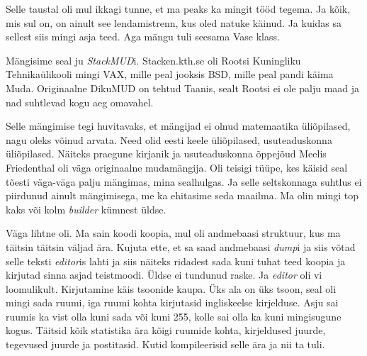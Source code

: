 Selle taustal oli mul ikkagi tunne, et ma peaks ka mingit tööd tegema. Ja kõik, 
mis sul on, on ainult see lendamistrenn, kus oled natuke käinud. Ja kuidas sa 
sellest siis mingi asja teed. Aga mängu tuli seesama Vase klass.

Mängisime seal ju \emph{StackMUD}i. Stacken.kth.se oli Rootsi 
Kuningliku Tehnikaülikooli mingi 
VAX, mille peal 
jooksis BSD, mille peal pandi käima Muda. 
Originaalne DikuMUD on tehtud Taanis, sealt Rootsi ei ole palju maad ja nad 
suhtlevad kogu aeg omavahel.

Selle mängimise tegi huvitavaks, et mängijad ei olnud  matemaatika üliõpilased, 
nagu oleks võinud arvata. Need olid eesti keele üliõpilased, usuteaduskonna 
üliõpilased. Näiteks praegune kirjanik ja usuteaduskonna õppejõud Meelis 
Friedenthal oli väga originaalne mudamängija. 
Oli teisigi tüüpe, kes  käisid seal tõesti väga-väga palju mängimas, mina 
sealhulgas. Ja selle seltskonnaga suhtlus ei  piirdunud ainult 
mängimisega, me ka ehitasime seda maailma. Ma olin mingi top kaks või kolm 
\emph{builder} kümnest üldse.


Väga lihtne oli. Ma sain koodi koopia, mul oli andmebaasi struktuur, kus ma 
täitsin täitsin väljad ära. Kujuta ette, et sa saad andmebaasi \emph{dump}i ja 
siis võtad selle teksti \emph{editor}is lahti ja siis  näiteks ridadest sada 
kuni tuhat teed koopia ja  kirjutad sinna asjad teistmoodi. Üldse ei tundunud 
raske. Ja \emph{editor} oli vi 
loomulikult. Kirjutamine käis tsoonide kaupa. Üks ala on üks tsoon, seal oli 
mingi sada ruumi, iga ruumi kohta kirjutasid ingliskeelse kirjelduse. Asju sai 
ruumis ka vist olla kuni sada või kuni 255, kolle sai olla ka kuni mingisugune 
kogus. Täitsid kõik statistika ära kõigi ruumide kohta, kirjeldused juurde, 
tegevused juurde ja postitasid. Kutid kompileerisid selle ära ja nii ta tuli. 

